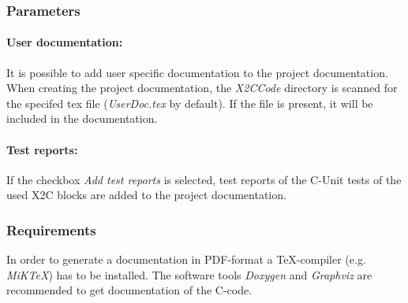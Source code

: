 \subsubsection*{Parameters}
\paragraph*{User documentation:}
It is possible to add user specific documentation to the project documentation. When creating the project documentation, the \textit{X2CCode} directory is scanned for the specifed tex file (\textit{UserDoc.tex} by default). If the file is present, it will be included in the documentation.

\paragraph*{Test reports:}
If the checkbox \textit{Add test reports} is selected, test reports of the C-Unit tests of the used X2C blocks are added to the project documentation.

\subsubsection*{Requirements}
In order to generate a documentation in PDF-format a TeX-compiler (e.g. \textit{MiKTeX}) has to be installed. The software tools \textit{Doxygen} and \textit{Graphviz} are recommended to get documentation of the C-code.


